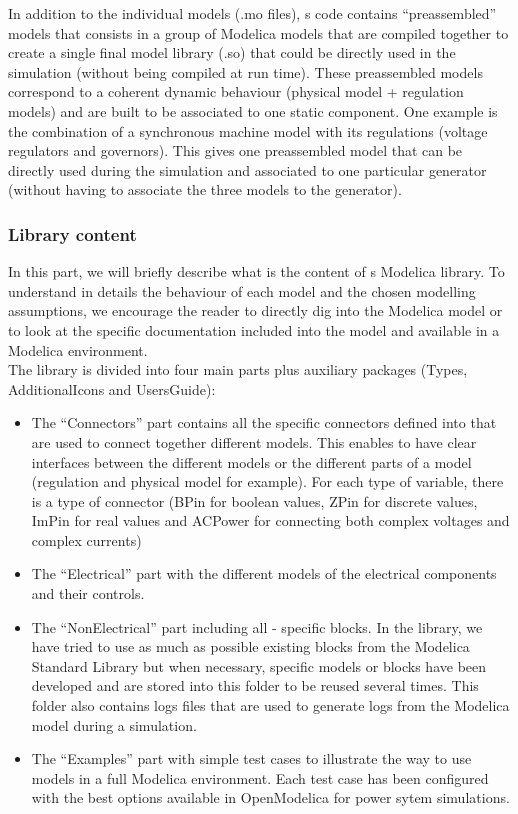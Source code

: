 \documentclass[a4paper, 12pt]{report}
\begin{document}
In addition to the individual models (.mo files), \Dynawo\textquotesingle s code contains ``preassembled'' models that consists in a group of Modelica models that are compiled together to create a single final model library (.so) that could be directly used in the simulation (without being compiled at run time). These preassembled models correspond to a coherent dynamic behaviour (physical model + regulation models) and are built to be associated to one static component. One example is the combination of a synchronous machine model with its regulations (voltage regulators and governors). This gives one preassembled model that can be directly used during the simulation and associated to one particular generator (without having to associate the three models to the generator).

\subsubsection{Library content}

In this part, we will briefly describe what is the content of \Dynawo\textquotesingle s Modelica library. To understand in details the behaviour of each model and the chosen modelling assumptions, we encourage the reader to directly dig into the Modelica  model or to look at the specific documentation included into the model and available in a Modelica environment.\\

The \Dynawo library is divided into four main parts plus auxiliary packages (Types, AdditionalIcons and UsersGuide):
\begin{itemize}
\item The ``Connectors'' part contains all the specific connectors defined into \Dynawo that are used to connect together different models. This enables to have clear interfaces between the different models or the different parts of a model (regulation and physical model for example). For each type of variable, there is a type of connector (BPin for boolean values, ZPin for discrete values, ImPin for real values and ACPower for connecting both complex voltages and complex currents)
\item The ``Electrical'' part with the different models of the electrical components and their controls.
\item The ``NonElectrical'' part including all \Dynawo - specific blocks. In the library, we have tried to use as much as possible existing blocks from the Modelica Standard Library but when necessary, specific models or blocks have been developed and are stored into this folder to be reused several times. This folder also contains logs files that are used to generate logs from the Modelica model during a simulation.
\item The ``Examples'' part with simple test cases to illustrate the way to use \Dynawo models in a full Modelica environment. Each test case has been configured with the best options available in OpenModelica for power sytem simulations.
\end{itemize}
\end{document}
